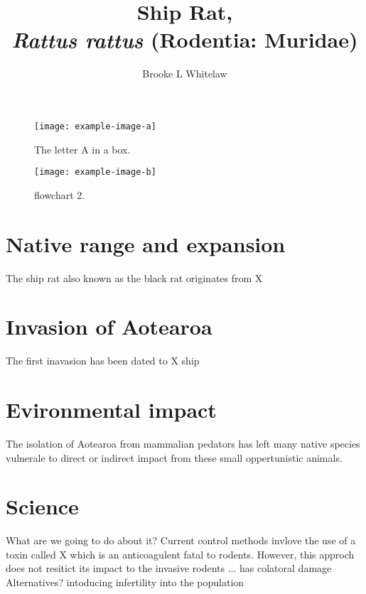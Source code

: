 \documentclass[twocolumn, letterpaper]{scrartcl}
\begin{document}
    \title{\color{triton_green}Ship Rat,\\ \textit{Rattus rattus} (Rodentia: Muridae)}
    \author{Brooke L Whitelaw}
    \date{}

	\maketitle
	
	
	\begin{figure}[tbp]
		\texttt{[image: example-image-a]}
		\caption{The letter A in a box. \label{fig:a}}
		\vspace{0.1in}
		\texttt{[image: example-image-b]}
		\caption{flowchart 2. \label{fig:b}}
	\end{figure}	
    
    \section*{Native range and expansion}

    	The ship rat also known as the black rat originates from X
        
    \section*{Invasion of Aotearoa}
        The first inavasion has been dated to X ship 
	
    
    \section*{Evironmental impact}
        The isolation of Aotearoa from mammalian pedators has left many native species vulnerale to direct or indirect impact from these small oppertunistic animals.

    \section*{Science}
        What are we going to do about it?
        Current control methods invlove the use of a toxin called X which is an anticoagulent fatal to rodents. However, this approch does not resitict its impact to the invasive rodents ... has colatoral damage 
        Alternatives? 
        intoducing infertility into the population 

    
    
    \begin{thebibliography}{9}

   

    \end{thebibliography}
    
	\blurb
\end{document}
